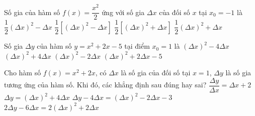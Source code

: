 \begin{ex}%
	Số gia của hàm số $f(x)=\dfrac{x^2}{2}$ ứng  với số gia $\Delta x$ của đối số $x$ tại $x_0=-1$ là
	\choice 
		{\True $\dfrac{1}{2}(\Delta x)^2-\Delta  x$}
		{$\dfrac{1}{2}\left[(\Delta x)^2-\Delta  x\right]$}
		 {$\dfrac{1}{2}\left[(\Delta x)^2+\Delta x\right]$}
		{$\dfrac{1}{2}(\Delta  x)^2+\Delta x$}
\end{ex}

\begin{ex}%
	Số gia $\Delta y$ của hàm số  $y = x^2 + 2x - 5$ tại điểm $x_0 = 1$ là
	 \choice
		{$(\Delta x)^2 -  4\Delta x$}
		{\True $\left( \Delta x \right)^2  + 4\Delta x$}
		{$\left(\Delta x  \right)^2 - 2\Delta x$}
		{$\left( \Delta x  \right)^2 + 2\Delta x - 5$}
\end{ex}



\begin{ex}%
 Cho hàm số  $f(x)=x^2+2x$, có $\Delta x$ là số gia của đối số tại $x=1$, $\Delta y$ là số gia tương ứng của hàm số. Khi đó, các khẳng định sau đúng hay sai?
  \choiceTF
   {$\dfrac{\Delta y}{\Delta x} = \Delta x+2$}
   {\True $\Delta y = (\Delta x)^2+4 \Delta x$}
  {$\Delta y - 4\Delta x = (\Delta x)^2 -  2 \Delta x-3$}
  {\True $2\Delta y - 6\Delta x  = 2(\Delta x)^2 + 2 \Delta x$}
\end{ex}

